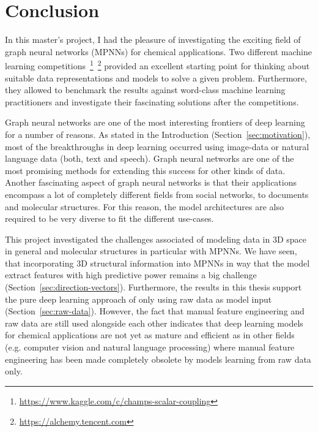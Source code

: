 \chapter{Conclusion}
\label{chapter:Conclusion}

In this master's project, I had the pleasure of investigating the exciting field of graph neural networks (MPNNs) for chemical applications. Two different machine learning competitions~\footnote{\url{https://www.kaggle.com/c/champs-scalar-coupling}}~\footnote{\url{https://alchemy.tencent.com}} provided an excellent starting point for thinking about suitable data representations and models to solve a given problem. Furthermore, they allowed to benchmark the results against word-class machine learning practitioners and investigate their fascinating solutions after the competitions.

Graph neural networks are one of the most interesting frontiers of deep learning for a number of reasons. As stated in the Introduction (Section~\ref{sec:motivation}), most of the breakthroughs in deep learning occurred using image-data or natural language data (both, text and speech). Graph neural networks are one of the most promising methods for extending this success for other kinds of data. Another fascinating aspect of graph neural networks is that their applications encompass a lot of completely different fields from social networks, to documents and molecular structures. For this reason, the model architectures are also required to be very diverse to fit the different use-cases.

This project investigated the challenges associated of modeling data in 3D space in general and molecular structures in particular with MPNNs. We have seen, that incorporating 3D structural information into MPNNs in way that the model extract features with high predictive power remains a big challenge (Section~\ref{sec:direction-vectors}). Furthermore, the results in this thesis support the pure deep learning approach of only using raw data as model input (Section~\ref{sec:raw-data}). However, the fact that manual feature engineering and raw data are still used alongside each other indicates that deep learning models for chemical applications are not yet as mature and efficient as in other fields (e.g. computer vision and natural language processing) where manual feature engineering has been made completely obsolete by models learning from raw data only.

